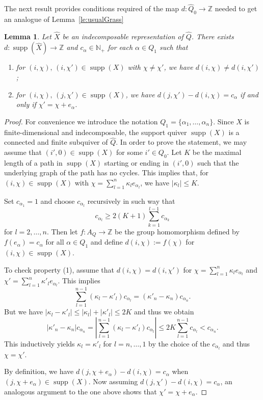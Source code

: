 \documentclass{amsart}
\newtheorem{lemma}[theorem]{Lemma}
\numberwithin{equation}{section}
\newcommand{\ZZ}{\mathbb{Z}}
\newcommand{\supp}{\operatorname{supp}}
\begin{document}
The next result provides conditions required of the map $d:\hat Q_0\to\ZZ$ needed to get an analogue of Lemma~\ref{le:usualGrass}
\begin{lemma}
  \label{le:degree condition} 
  Let $\hat X$ be an indecomposable representation of $\hat Q$.
  There exists $d:\supp(\hat X)\to\ZZ$ and $c_\alpha\in\mathbb N_+$ for each $\alpha\in Q_1$ such that
  \begin{enumerate}
    \item for $(i,\chi),\,(i,\chi')\in\supp(X)$ with $\chi\neq\chi'$, we have $d(i,\chi)\ne d(i,\chi')$;
    \item for $(i,\chi),\,(j,\chi')\in\supp(X)$, we have $d(j,\chi')-d(i,\chi)=c_\alpha$ if and only if $\chi'=\chi+e_\alpha$.
  \end{enumerate}
\end{lemma}
\begin{proof}
  For convenience we introduce the notation $Q_1=\{\alpha_1,\ldots,\alpha_n\}$.
  Since $X$ is finite-dimensional and indecomposable, the support quiver $\supp(X)$ is a connected and finite subquiver of $\hat Q$.
  In order to prove the statement, we may assume that $(i',0)\in\supp(X)$ for some $i'\in Q_0$.
  Let $K$ be the maximal length of a path in $\supp(X)$ starting or ending in $(i',0)$ such that the underlying graph of the path has no cycles.
  This implies that, for $(i,\chi)\in\supp(X)$ with $\chi=\sum_{l=1}^n \kappa_l e_{\alpha_l}$, we have $|\kappa_l|\leq K$.

  Set $c_{\alpha_1}=1$ and choose $c_{\alpha_l}$ recursively in such way that 
  \[c_{\alpha_l}\geq 2(K+1)\sum_{k=1}^{l-1} c_{\alpha_k}\]
  for $l=2,\ldots,n$.  
  Then let $f:A_Q\to\ZZ$ be the group homomorphism defined by $f(e_\alpha)=c_\alpha$ for all $\alpha\in Q_1$ and define $d(i,\chi):=f(\chi)$ for $(i,\chi)\in\supp(X)$.

  To check property (1), assume that $d(i,\chi)=d(i,\chi')$ for $\chi=\sum_{l=1}^n \kappa_l e_{\alpha_l}$ and $\chi'=\sum_{l=1}^n \kappa'_l e_{\alpha_l}$.
  This implies
  \[\sum_{l=1}^{n-1}(\kappa_l-\kappa'_l)c_{\alpha_l}=(\kappa'_n-\kappa_n)c_{\alpha_n}.\]
  But we have $|\kappa_l-\kappa'_l|\leq |\kappa_l|+|\kappa'_l|\le 2K$ and thus we obtain 
  \[|\kappa'_n-\kappa_n|c_{\alpha_n}=\left|\sum_{l=1}^{n-1}(\kappa_l-\kappa'_l)c_{\alpha_l}\right|\le 2K\sum_{l=1}^{n-1}c_{\alpha_l} < c_{\alpha_n}.\]
  This inductively yields $\kappa_l=\kappa'_l$ for $l=n,\ldots,1$ by the choice of the $c_{\alpha_l}$ and thus $\chi=\chi'$. 

  By definition, we have $d(j,\chi+e_\alpha)-d(i,\chi)=c_\alpha$ when $(j,\chi+e_\alpha)\in\supp(X)$.
  Now assuming $d(j,\chi')-d(i,\chi)=c_\alpha$, an analogous argument to the one above shows that $\chi'=\chi+e_\alpha$.
\end{proof}
\end{document}
